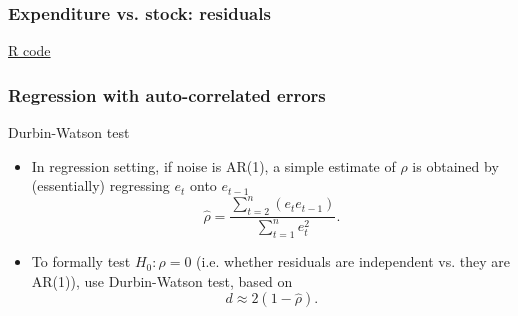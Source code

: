 \documentclass[handout]{beamer}
\begin{document}


   \begin{frame}
   \frametitle{Expenditure vs. stock: residuals}
   \begin{center}
   \end{center}
   \href{http://stats191.stanford.edu/correlated_errors.html#consumer-expenditure}{R code}
   \end{frame}


   \begin{frame} \frametitle{Regression with auto-correlated errors}

   \begin{block}
   {Durbin-Watson   test }

   \begin{itemize}

   \item In regression setting, if noise is AR(1), a simple estimate of $\rho$ is obtained
   by (essentially) regressing $e_t$ onto $e_{t-1}$
   $$
   \widehat{\rho} = \frac{\sum_{t=2}^n \left(e_t e_{t-1}\right)}{\sum_{t=1}^n e_t^2}.$$

   \item To formally test $H_0:\rho=0$ (i.e. whether residuals are independent vs. they are AR(1)), use Durbin-Watson test, based on
   $$
   d \approx 2(1 - \widehat{\rho}).$$
   \end{itemize}
   \end{block}
   \end{frame}

\end{document}
